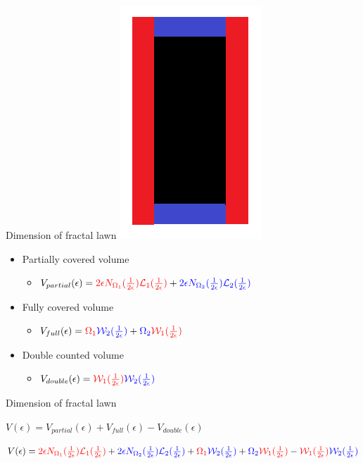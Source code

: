 \documentclass{if-beamer}
\begin{document}
\begin{frame}{Dimension of fractal lawn}
	\includegraphics[scale=0.25]{VolumeBox.png}
	
	\begin{itemize}
		\item Partially covered volume
		\begin{itemize}
			\item $V_{partial}(\epsilon)=\textcolor{red}{2\epsilon N_{\Omega_1}(\frac{1}{2\epsilon})\mathcal{L}_1(\frac{1}{2\epsilon})} + \textcolor{blue}{2\epsilon N_{\Omega_2}(\frac{1}{2\epsilon})\mathcal{L}_2(\frac{1}{2\epsilon})}$
		\end{itemize}
		
		\item Fully covered volume
		\begin{itemize}
			\item $V_{full}(\epsilon)=\textcolor{red}{\Omega_1} \textcolor{blue}{\mathcal{W}_2(\frac{1}{2\epsilon})} + \textcolor{blue}{\Omega_2} \textcolor{red}{\mathcal{W}_1(\frac{1}{2\epsilon})}$
		\end{itemize}
		
		\item Double counted volume
		\begin{itemize}
			\item $V_{double}(\epsilon)=\textcolor{red}{\mathcal{W}_1(\frac{1}{2\epsilon})} \textcolor{blue}{\mathcal{W}_2(\frac{1}{2\epsilon})}$
		\end{itemize}
	\end{itemize}
	
\end{frame}

\begin{frame}{Dimension of fractal lawn}
	
	$V(\epsilon)=V_{partial}(\epsilon) + V_{full}(\epsilon) - V_{double}(\epsilon)$
	
	$V(\epsilon)=\textcolor{red}{2\epsilon N_{\Omega_1}(\frac{1}{2\epsilon})\mathcal{L}_1(\frac{1}{2\epsilon})} + \textcolor{blue}{2\epsilon N_{\Omega_2}(\frac{1}{2\epsilon})\mathcal{L}_2(\frac{1}{2\epsilon})} + \textcolor{red}{\Omega_1} \textcolor{blue}{\mathcal{W}_2(\frac{1}{2\epsilon})} + \textcolor{blue}{\Omega_2} \textcolor{red}{\mathcal{W}_1(\frac{1}{2\epsilon})} - \textcolor{red}{\mathcal{W}_1(\frac{1}{2\epsilon})} \textcolor{blue}{\mathcal{W}_2(\frac{1}{2\epsilon})}$
\end{frame}
\end{document}
